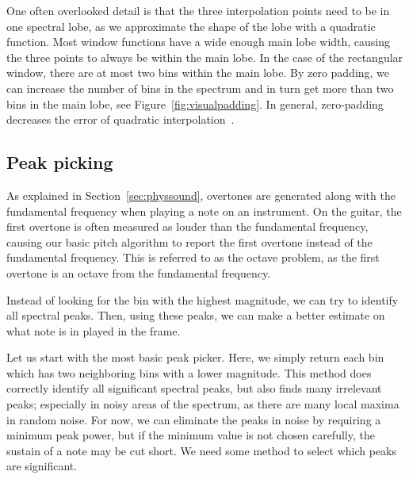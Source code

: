 \documentclass[a4paper,10pt,twocolumn]{article}
\begin{document}
One often overlooked detail is that the three interpolation points need to be in one spectral lobe, as we approximate the shape of the lobe with a quadratic function. Most window functions have a wide enough main lobe width, causing the three points to always be within the main lobe. In the case of the rectangular window, there are at most two bins within the main lobe. By zero padding, we can increase the number of bins in the spectrum and in turn get more than two bins in the main lobe, see Figure~\ref{fig:visualpadding}. In general, zero-padding decreases the error of quadratic interpolation~\cite{interpolnozero}.


\subsection{Peak picking}
As explained in Section~\ref{sec:physsound}, overtones are generated along with the fundamental frequency when playing a note on an instrument. On the guitar, the first overtone is often measured as louder than the fundamental frequency, causing our basic pitch algorithm to report the first overtone instead of the fundamental frequency. This is referred to as the octave problem, as the first overtone is an octave from the fundamental frequency.

Instead of looking for the bin with the highest magnitude, we can try to identify all spectral peaks. Then, using these peaks, we can make a better estimate on what note is in played in the frame.

Let us start with the most basic peak picker. Here, we simply return each bin which has two neighboring bins with a lower magnitude. This method does correctly identify all significant spectral peaks, but also finds many irrelevant peaks; especially in noisy areas of the spectrum, as there are many local maxima in random noise. For now, we can eliminate the peaks in noise by requiring a minimum peak power, but if the minimum value is not chosen carefully, the sustain of a note may be cut short. We need some method to select which peaks are significant.
\end{document}
